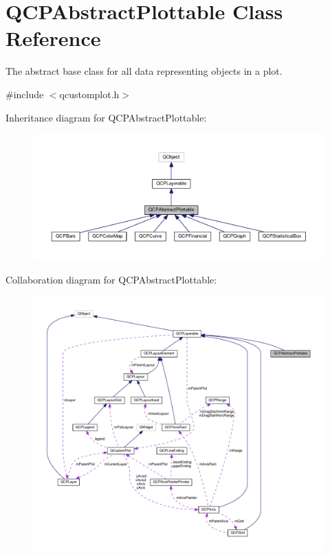 \hypertarget{classQCPAbstractPlottable}{}\section{Q\+C\+P\+Abstract\+Plottable Class Reference}
\label{classQCPAbstractPlottable}


The abstract base class for all data representing objects in a plot.  




{\ttfamily \#include $<$qcustomplot.\+h$>$}



Inheritance diagram for Q\+C\+P\+Abstract\+Plottable\+:
\nopagebreak
\begin{figure}[H]
\begin{center}
\leavevmode
\includegraphics[width=350pt]{classQCPAbstractPlottable__inherit__graph}
\end{center}
\end{figure}


Collaboration diagram for Q\+C\+P\+Abstract\+Plottable\+:
\nopagebreak
\begin{figure}[H]
\begin{center}
\leavevmode
\includegraphics[width=350pt]{classQCPAbstractPlottable__coll__graph}
\end{center}
\end{figure}
